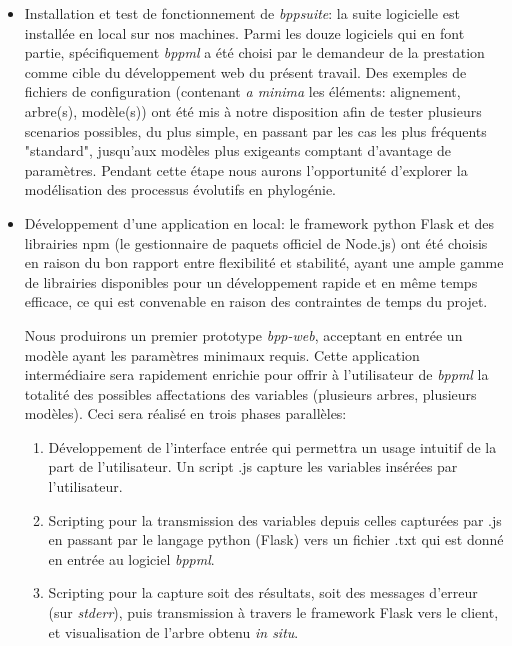\begin{itemize}[topsep=1ex,itemsep=1ex,partopsep=1ex,parsep=1ex]
	\item Installation et test de fonctionnement de \textit{bppsuite}: la suite logicielle est installée en local sur nos machines. 
	Parmi les douze logiciels qui en font partie, spécifiquement   \textit{bppml} a été choisi par le demandeur de la prestation comme cible 
	du développement web du présent travail. Des exemples de fichiers de configuration (contenant \textit{a minima} les éléments: alignement, arbre(s), modèle(s)) 
	ont été mis à notre disposition  
	afin de tester plusieurs scenarios possibles, du plus simple, en passant par les cas les plus fréquents "standard",
	jusqu'aux modèles plus exigeants comptant d'avantage de paramètres. Pendant cette étape nous aurons l'opportunité d'explorer
	 la modélisation des processus évolutifs en phylogénie.
	
	\item Développement d'une application en local: le framework python Flask et des librairies npm
	(le gestionnaire de paquets officiel de Node.js) 
	ont été choisis en raison du bon rapport entre flexibilité et stabilité, 
	ayant une ample gamme de librairies disponibles pour un développement rapide et en même temps efficace, 
	ce qui est convenable en raison des contraintes de temps du projet.

	Nous produirons un premier prototype  \textit{bpp-web}, acceptant en entrée un modèle ayant les paramètres minimaux requis.
	Cette application intermédiaire sera rapidement enrichie pour offrir à l'utilisateur de \textit{bppml} la totalité des possibles affectations 
	des variables (plusieurs arbres, plusieurs modèles).
	Ceci sera réalisé en trois phases parallèles:
	\begin{enumerate}[topsep=1ex,itemsep=1ex,partopsep=1ex,parsep=1ex]
		\item Développement de l'interface entrée qui permettra un usage intuitif de la part de l'utilisateur. 
		Un script .js capture les variables insérées par l'utilisateur. 
		\item Scripting pour la transmission des variables depuis celles capturées par .js en passant par le langage 
		python (Flask) vers un fichier .txt qui est donné en entrée au logiciel \textit{bppml}.
		\item Scripting pour la capture soit des résultats, soit des messages d'erreur (sur \textit{stderr}),
		puis transmission à travers le framework Flask vers le client,
		et visualisation de l'arbre obtenu \textit{in situ}.
	\end{enumerate}
	

\end{itemize}
